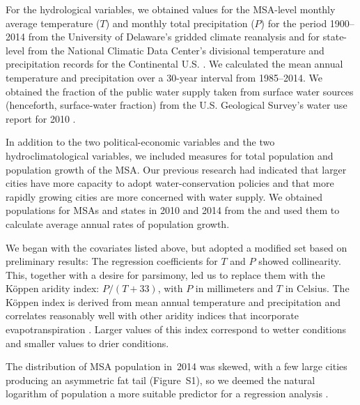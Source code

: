\documentclass[draft,linenumbers]{agujournal}\usepackage{knitr}
\begin{document}
For the hydrological variables, we
obtained values for the MSA-level monthly average temperature ($T$) and monthly
total precipitation ($P$) for the period 1900--2014 from the University of Delaware's
gridded climate reanalysis
\citep{matsuura:gridded.temp:2015,matsuura:gridded.precip:2015}
and for state-level from the National Climatic Data Center's divisional temperature
and precipitation records for the Continental U.S.
\citep{vose:nclimdiv:2014}.
We calculated the mean annual temperature and precipitation over a
30-year interval from 1985--2014.
We obtained the fraction of the public water supply taken from surface water sources
(henceforth, surface-water fraction) from the U.S. Geological
Survey's water use report for 2010 \citep{maupin:water.use:2014}.

In addition to the two political-economic variables and the two hydroclimatological variables,
we included measures for total population and population growth of the MSA. Our previous research had
indicated that larger cities have more capacity to adopt water-conservation policies and that more
rapidly growing cities are more concerned with water supply. We obtained populations for MSAs and states
in 2010 and 2014 from the \citet{census:population:2015} and used them to calculate average annual rates
of population growth.

We began with the covariates listed above, but adopted a modified set based on
preliminary results: The regression coefficients for $T$ and $P$ showed
collinearity.
This, together with a desire for parsimony, led us to replace them with the
K\"oppen aridity index: $P / (T + 33)$, with $P$ in millimeters and $T$ in
Celsius.
The K\"oppen index is
derived from mean annual temperature and precipitation
and correlates reasonably well with other aridity indices
that incorporate evapotranspiration
\citep{quan:aridity:2013}.
Larger values of this index correspond to wetter conditions
and smaller values to drier conditions.

The distribution of MSA population in~2014 was skewed, with
a few large cities producing an asymmetric fat tail (Figure~S1),
so we deemed the natural logarithm of population
a more suitable predictor
for a regression analysis \citep[pp.~59--61]{gelman:arm:2007}.
\end{document}
